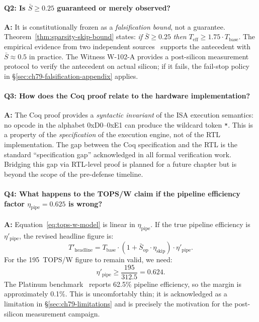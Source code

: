 \paragraph{Q2: Is $\bar{S} \geq 0.25$ guaranteed or merely observed?}
\textbf{A:} It is constitutionally frozen as a \emph{falsification bound},
not a guarantee.
Theorem~\ref{thm:sparsity-skip-bound} states: \emph{if} $\bar{S} \geq 0.25$
\emph{then} $T_{\mathrm{eff}} \geq 1.75 \cdot T_{\mathrm{base}}$.
The empirical evidence from two independent sources~\cite{huang2025tenet,platinum2025}
supports the antecedent with $\bar{S} \approx 0.5$ in practice.
The Witness W-102-A provides a post-silicon measurement protocol to
verify the antecedent on actual silicon; if it fails, the fail-stop
policy in §\ref{sec:ch79-falsification-appendix} applies.

\paragraph{Q3: How does the Coq proof relate to the hardware implementation?}
\textbf{A:} The Coq proof provides a \emph{syntactic invariant} of the
ISA execution semantics: no opcode in the alphabet 0xD0--0xE1 can
produce the wildcard token \texttt{*}.
This is a property of the \emph{specification} of the execution engine,
not of the RTL implementation.
The gap between the Coq specification and the RTL is the standard
``specification gap'' acknowledged in all formal verification work.
Bridging this gap via RTL-level proof is planned for a future chapter
but is beyond the scope of the pre-defense timeline.

\paragraph{Q4: What happens to the TOPS/W claim if the pipeline efficiency
  factor $\eta_{\mathrm{pipe}} = 0.625$ is wrong?}
\textbf{A:} Equation~\eqref{eq:tops-w-model} is linear in $\eta_{\mathrm{pipe}}$.
If the true pipeline efficiency is $\eta'_{\mathrm{pipe}}$, the
revised headline figure is:
\[
  T'_{\mathrm{headline}} = T_{\mathrm{base}} \cdot
    (1 + \bar{S}_{\mathrm{op}} \cdot \eta_{\mathrm{skip}}) \cdot \eta'_{\mathrm{pipe}}.
\]
For the 195~TOPS/W figure to remain valid, we need:
\[
  \eta'_{\mathrm{pipe}} \geq \frac{195}{312.5} = 0.624.
\]
The Platinum benchmark~\cite{platinum2025} reports 62.5\% pipeline
efficiency, so the margin is approximately 0.1\%.
This is uncomfortably thin; it is acknowledged as a limitation
in §\ref{sec:ch79-limitations} and is precisely the motivation for
the post-silicon measurement campaign.

